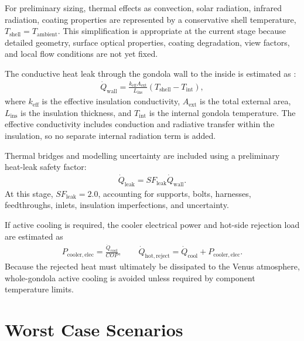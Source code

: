 For preliminary sizing, thermal effects as convection, solar radiation, infrared radiation, coating properties are represented by a conservative shell temperature, \(T_{\mathrm{shell}} = T_{\mathrm{ambient}}\). This simplification is appropriate at the current stage because detailed geometry, surface optical properties, coating degradation, view factors, and local flow conditions are not yet fixed.

The conductive heat leak through the gondola wall to the inside is estimated as \cite{incropera2011heattransfer}:
\begin{align}
    \dot{Q}_{\mathrm{wall}} =
    \frac{k_{\mathrm{eff}} A_{\mathrm{ext}}}{L_{\mathrm{ins}}}
    \left(T_{\mathrm{shell}} - T_{\mathrm{int}}\right),
    \label{eq:q_wall_prescribed_shell}
\end{align}
where \(k_{\mathrm{eff}}\) is the effective insulation conductivity, \(A_{\mathrm{ext}}\) is the total external area, \(L_{\mathrm{ins}}\) is the insulation thickness, and \(T_{\mathrm{int}}\) is the internal gondola temperature. The effective conductivity includes conduction and radiative transfer within the insulation, so no separate internal radiation term is added.

Thermal bridges and modelling uncertainty are included using a preliminary heat-leak safety factor:
\begin{align}
    \dot{Q}_{\mathrm{leak}} =
    SF_{\mathrm{leak}} \dot{Q}_{\mathrm{wall}}.
    \label{eq:q_leak_sf}
\end{align}
At this stage, \(SF_{\mathrm{leak}}=2.0\), accounting for supports, bolts, harnesses, feedthroughs, inlets, insulation imperfections, and uncertainty.

If active cooling is required, the cooler electrical power and hot-side rejection load are estimated as
\begin{align}
    P_{\mathrm{cooler,elec}} =
    \frac{\dot{Q}_{\mathrm{cool}}}{COP},
    \qquad
    \dot{Q}_{\mathrm{hot,reject}} =
    \dot{Q}_{\mathrm{cool}} + P_{\mathrm{cooler,elec}}.
    \label{eq:cooler_power_rejection}
\end{align}
Because the rejected heat must ultimately be dissipated to the Venus atmosphere, whole-gondola active cooling is avoided unless required by component temperature limits.


\section{Worst Case Scenarios}
\label{sec:tcs_worst_case_scenarios}

